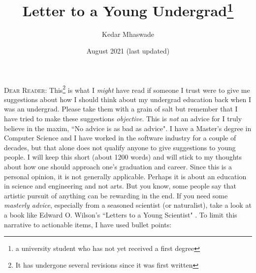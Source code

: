 \documentclass[a6paper]{article}
\begin{document}
\title{Letter to a Young Undergrad\footnote{a university student who has not yet received a first degree}}
\date{August 2021 {\small (last updated)}}
\author{Kedar Mhaswade}
\maketitle
\lettrine[lines=3]{D}{ear Reader}: This\footnote{It has undergone several revisions since it was first written} is what I \emph{might} have read if someone I trust were to give me suggestions about how I should think about my undergrad education back when I was an undergrad. Please take them with a grain of salt but remember that I have tried to make these suggestions \emph{objective}. This is \emph{not} an advice for I truly believe in the maxim, ``No advice is as bad as advice". I have a Master's degree in Computer Science and I have worked in the software industry for a couple of decades, but that alone does not qualify anyone to give suggestions to young people. I will keep this short (about 1200 words) and will stick to my thoughts about how one should approach one's graduation and career. Since this is a personal opinion, it is not generally applicable. Perhaps it is about an education in science and engineering and not arts. But you know, some people say that artistic pursuit of anything can be rewarding in the end. If you need some \emph{masterly advice}, especially from a seasoned scientist (or naturalist), take a look at a book like Edward O. Wilson's ``Letters to a Young Scientist" \cite{letters}. To limit this narrative to actionable items, I have used bullet points:
\end{document}
